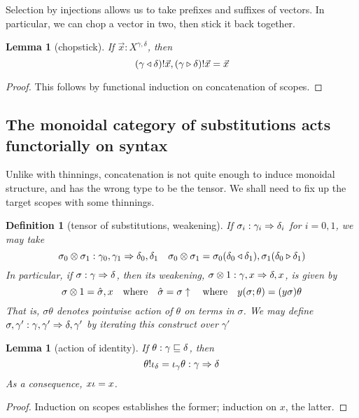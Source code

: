 \documentclass{jfp1}
\newtheorem{lemma}[theorem]{Lemma}
\newtheorem{definition}[theorem]{Definition}
\begin{document}
Selection by injections allows us to take prefixes and suffixes of
vectors. In particular, we can chop a vector in two, then stick it back
together.

\begin{lemma}[chopstick]
  If $\vec x : X^{\gamma,\delta}$, then
  \[
    (\gamma \triangleleft \delta)!\vec x, (\gamma \triangleright \delta)!\vec x
    = \vec x
  \]
\end{lemma}
\begin{proof}
  This follows by functional induction on concatenation of scopes.
\end{proof}


\subsection{The monoidal category of substitutions acts functorially on syntax\label{sec:sbstcat}}

Unlike with thinnings, concatenation is not quite enough
to induce monoidal structure, and has the wrong type to be the tensor.
We shall need to fix up the target scopes with some thinnings.

\begin{definition}[tensor of substitutions, weakening]
  If $\sigma_i : \gamma_i\Rightarrow\delta_i$ for $i=0,1$, we may take
  \[
    \sigma_0\otimes\sigma_1 : \gamma_0,\gamma_1 \Rightarrow \delta_0,\delta_1
    \quad
    \sigma_0\otimes\sigma_1 = \sigma_0(\delta_0 \triangleleft \delta_1),\sigma_1(\delta_0 \triangleright \delta_1)
  \]
  In particular, if $\sigma : \gamma\Rightarrow\delta$, then its weakening,
  $\sigma\otimes1 : \gamma,x\Rightarrow\delta,x$,
  is given by
  \[\sigma\otimes1 = \hat\sigma,x  \quad\mbox{where}\quad \hat\sigma = \sigma\uparrow
     \quad\mbox{where}\quad y(\sigma;\theta) = (y\sigma)\theta
  \]
  That is, $\sigma\theta$ denotes pointwise action of $\theta$ on terms in $\sigma$.
  We may define $\sigma,\gamma' : \gamma,\gamma' \Rightarrow \delta,\gamma'$ by iterating this construct
  over $\gamma'$
\end{definition}

\begin{lemma}[action of identity\label{lem:sbstid}]
  If $\theta:\gamma\sqsubseteq\delta$, then
  \[
    \theta!\iota_\delta = \iota_\gamma\theta : \gamma\Rightarrow\delta
  \]
  As a consequence, $x\iota = x$.
\end{lemma}
\begin{proof}
  Induction on scopes establishes the former; induction on $x$, the latter.
\end{proof}
\end{document}
